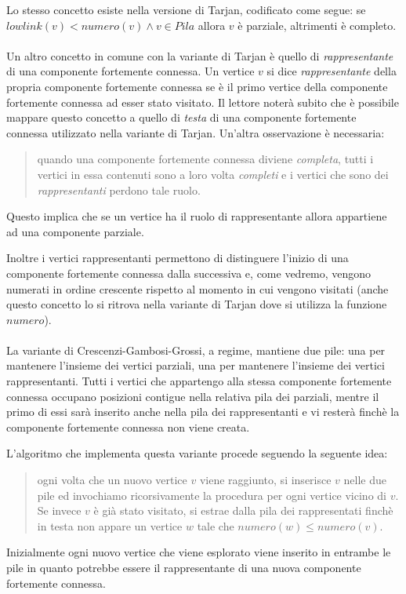 Lo stesso concetto esiste nella versione di Tarjan, codificato come
segue: se $lowlink(v) < numero(v) \wedge v \in Pila$ allora $v$ \`e
parziale, altrimenti \`e completo.
\\\\
Un altro concetto in comune con la variante di Tarjan \`e quello di
\emph{rappresentante} di una componente fortemente connessa. Un
vertice $v$ si dice \emph{rappresentante} della propria componente
fortemente connessa se \`e il primo vertice della componente
fortemente connessa ad esser stato visitato. Il lettore noter\`a
subito che \`e possibile mappare questo concetto a quello di
\emph{testa} di una componente fortemente connessa utilizzato nella
variante di Tarjan. Un'altra osservazione \`e necessaria:
\begin{quotation}
  quando una componente fortemente connessa diviene \emph{completa},
  tutti i vertici in essa contenuti sono a loro volta \emph{completi}
  e i vertici che sono dei \emph{rappresentanti} perdono tale ruolo.
\end{quotation}
Questo implica che se un vertice ha il ruolo di rappresentante allora
appartiene ad una componente parziale.

Inoltre i vertici rappresentanti permettono di distinguere l'inizio di
una componente fortemente connessa dalla successiva e, come vedremo,
vengono numerati in ordine crescente rispetto al momento in cui
vengono visitati (anche questo concetto lo si ritrova nella variante
di Tarjan dove si utilizza la funzione $numero$).
\\\\
La variante di Crescenzi-Gambosi-Grossi, a regime, mantiene due pile:
una per mantenere l'insieme dei vertici parziali, una per mantenere
l'insieme dei vertici rappresentanti. Tutti i vertici che appartengo
alla stessa componente fortemente connessa occupano posizioni contigue
nella relativa pila dei parziali, mentre il primo di essi sar\`a
inserito anche nella pila dei rappresentanti e vi rester\`a finch\`e
la componente fortemente connessa non viene creata.

L'algoritmo che implementa questa variante procede seguendo la
seguente idea:
\begin{quotation}
  ogni volta che un nuovo vertice $v$ viene raggiunto, si inserisce
  $v$ nelle due pile ed invochiamo ricorsivamente la procedura per
  ogni vertice vicino di $v$. Se invece $v$ \`e gi\`a stato visitato,
  si estrae dalla pila dei rappresentati finch\`e in testa non appare
  un vertice $w$ tale che $numero(w) \leq numero(v)$.
\end{quotation}
Inizialmente ogni nuovo vertice che viene esplorato viene inserito in
entrambe le pile in quanto potrebbe essere il rappresentante di una
nuova componente fortemente connessa.

